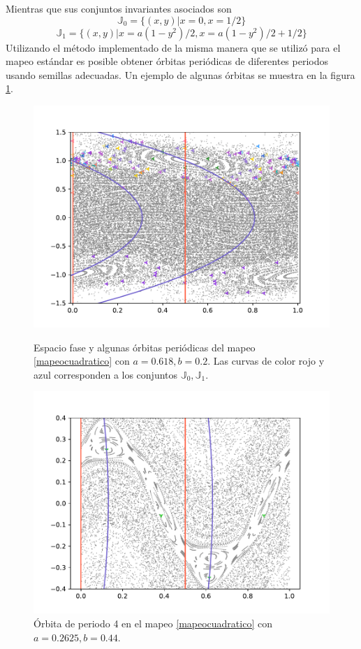 Mientras que sus conjuntos invariantes asociados son
\begin{equation}
	\mathbb{J}_{0} = \{ (x,y) | x=0 ,x=1/2\}
	\label{conjunto invariante cuadratico 0}
\end{equation}
\begin{equation}	
	\mathbb{J}_{1} = \{ (x,y)| x= a(1-y^{2})/2, x = a(1-y^{2})/2+1/2
		\}
	\label{conjunto invariante cuadratico 1}
\end{equation}
Utilizando el m\'etodo implementado de la misma manera que se utiliz\'o para el mapeo est\'andar es posible obtener \'orbitas peri\'odicas de diferentes periodos usando semillas adecuadas. Un ejemplo de algunas \'orbitas se muestra en la figura \ref{grafmapeocuadratico1}. \\

\begin{figure}[H]
	\includegraphics[scale=0.7]{MapeoCuadraDifP}
	\label{grafmapeocuadratico1}
	\caption{Espacio fase y algunas \'orbitas peri\'odicas del mapeo \eqref{mapeocuadratico} con $ a = 0.618, b=0.2$. Las curvas de color rojo y azul corresponden a los conjuntos $\mathbb{J}_{0}, \mathbb{J}_{1}$.} 
\end{figure}
\begin{figure}
	\centering
	\includegraphics[scale=0.6]{MApeoCP4A}
	\caption{\'Orbita de periodo 4 en el mapeo \eqref{mapeocuadratico} con $a = 0.2625, b = 0.44$.}
	\label{grafmapeocuadraper4}
\end{figure}
